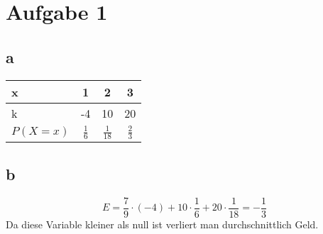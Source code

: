 
\section{Aufgabe 1}
\subsection{a}
\begin{tabular}{l|ccc}
  x & 1 & 2 & 3 \\
  \hline
  k & -4 &10 & 20 \\
  \hline
  $P(X=x)$ &
  $\frac{1}{6}$ &
  $\frac{1}{18}$ &
  $\frac{2}{3}$
\end{tabular}

\subsection{b}
\[ E = \frac{7}{9} \cdot (-4) + 
10 \cdot \frac{1}{6} + 
20 \cdot \frac{1}{18} 
= -\frac{1}{3} \]
Da diese Variable kleiner als null ist verliert man durchschnittlich Geld. 